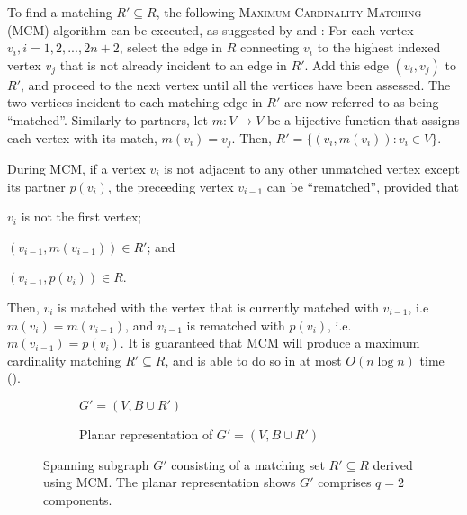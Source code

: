 \documentclass[oribibl]{llncs}
\begin{document}
To find a matching $R' \subseteq R$, the following \textsc{Maximum Cardinality Matching} (MCM) algorithm can be executed, as suggested by \cite{mahadev1994} and \cite{becker2010}: For each vertex $v_i, i=1,2,...,2n+2$, select the edge in $R$ connecting $v_i$ to the highest indexed vertex $v_j$ that is not already incident to an edge in $R'$. Add this edge $(v_i, v_j)$ to $R'$, and proceed to the next vertex until all the vertices have been assessed. The two vertices incident to each matching edge in $R'$ are now referred to as being ``matched''. Similarly to partners, let $m : V \to V$ be a bijective function that assigns each vertex with its match, $m(v_i) = v_j$. Then, $R' =\{(v_i, m(v_i)) : v_i \in V\}$. 

During MCM, if a vertex $v_i$ is not adjacent to any other unmatched vertex except its partner $p(v_i)$, the preceeding vertex $v_{i-1}$ can be ``rematched'', provided that 
\begin{enumerate*}[label={(\alph*)}]
	\item $v_i$ is not the first vertex; 
	\item $(v_{i-1}, m(v_{i-1})) \in R'$; and
	\item $(v_{i-1}, p(v_i)) \in R$.
\end{enumerate*}
Then, $v_i$ is matched with the vertex that is currently matched with $v_{i-1}$, i.e $m(v_i) = m(v_{i-1})$, and $v_{i-1}$ is rematched with $p(v_i)$, i.e. $m(v_{i-1}) = p(v_i)$. It is guaranteed that MCM will produce a maximum cardinality matching $R' \subseteq R$, and is able to do so in at most $O(n \log n)$ time (\citealp{mahadev1994}).

\begin{figure}	
	\centering
	\begin{subfigure}[h]{0.4\textwidth}
		
		\caption{$G' = (V, B \cup R')$}	
		\label{fig:matching}
	\end{subfigure} \quad
	\begin{subfigure}[h]{0.5\textwidth}
		
		\caption{Planar representation of $G' =(V, B \cup R')$}	
		\label{fig:mps}
	\end{subfigure}
	\caption{Spanning subgraph $G'$ consisting of a matching set $R' \subseteq R$ derived using MCM. The planar representation shows $G'$ comprises $q = 2$ components.}
	\label{fig:matching/mps}
\end{figure}
\end{document}
